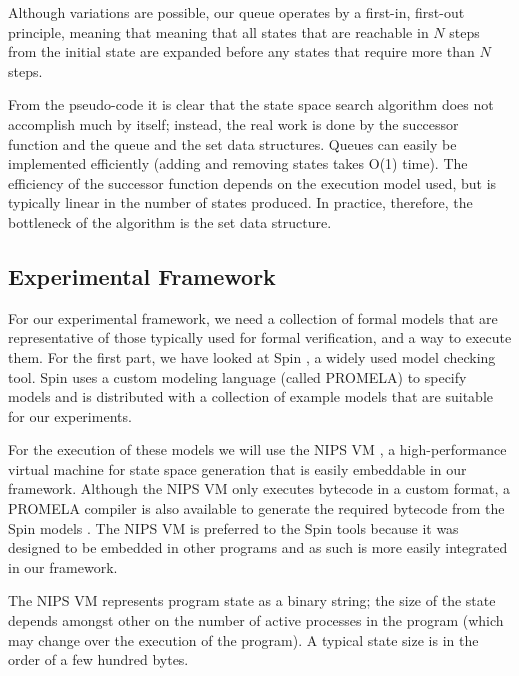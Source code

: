\documentclass{acm_proc_article-sp}
\begin{document}
Although variations are possible, our queue operates by a first-in, first-out
principle, meaning that meaning that all states that are reachable in $N$ steps
from the initial state are expanded before any states that require more than
$N$ steps.

From the pseudo-code it is clear that the state space search algorithm does not
accomplish much by itself; instead, the real work is done by the successor
function and the queue and the set data structures. Queues can easily be
implemented efficiently (adding and removing states takes O(1) time).
The efficiency of the successor function depends on the execution model used,
but is typically linear in the number of states produced. In practice,
therefore, the bottleneck of the algorithm is the set data structure.

\subsection{Experimental Framework}
For our experimental framework, we need a collection of formal models that are
representative of those typically used for formal verification, and a way to
execute them. For the first part, we have looked at Spin \cite{holzmann2004smc},
a widely used model checking tool.
Spin uses a custom modeling language (called PROMELA) to specify models and is
distributed with a collection of example models that are suitable for our
experiments.

For the execution of these models we will use the NIPS VM \cite{weber2007evm}, a
high-performance virtual machine for state space generation that is easily
embeddable in our framework. Although the NIPS VM only executes bytecode in a
custom format, a PROMELA compiler is also available to generate the required
bytecode from the Spin models \cite{nipsvm}. The NIPS VM is preferred to the
Spin tools because it was designed to be embedded in other programs and as
such is more easily integrated in our framework.

The NIPS VM represents program state as a binary string; the size of the state
depends amongst other on the number of active processes in the program (which
may change over the execution of the program).
A typical state size is in the order of a few hundred bytes.
\end{document}
